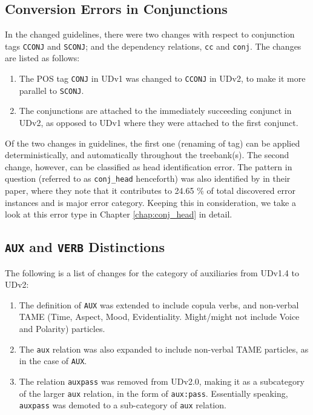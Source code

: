 \subsection{Conversion Errors in Conjunctions}
\label{sssec:conj_head}

In the changed guidelines, there were two changes with respect to conjunction tags \verb|CCONJ| and \verb|SCONJ|; and the dependency relations, \verb|cc| and \verb|conj|. The changes are listed as follows:

\begin{enumerate}
    \item The POS tag \verb|CONJ| in UDv1 was changed to \verb|CCONJ| in UDv2, to make it more parallel to \verb|SCONJ|.
    \item The conjunctions are attached to the immediately succeeding conjunct in UDv2, as opposed to UDv1 where they were attached to the first conjunct.
\end{enumerate}

Of the two changes in guidelines, the first one (renaming of tag) can be applied deterministically, and automatically throughout the treebank(s). The second change, however, can be classified as head identification error. The pattern in question (referred to as \texttt{conj\_head} henceforth) was also identified by \cite{alzetta2017dangerous} in their paper, where they note that it contributes to 24.65 \% of total discovered error instances and is major error category. Keeping this in consideration, we take a look at this error type in Chapter \ref{chap:conj_head} in detail.

\subsection{\texttt{AUX} and \texttt{VERB} Distinctions}
\label{ssec:AuxVERB}

The following is a list of changes for the category of auxiliaries from UDv1.4 to UDv2:

\begin{enumerate}
    \item The definition of \verb|AUX| was extended to include copula verbs, and non-verbal TAME (Time, Aspect, Mood, Evidentiality. Might/might not include Voice and Polarity) particles.
    \item The \verb|aux| relation was also expanded to include non-verbal TAME particles, as in the case of \verb|AUX|.
    \item The relation \verb|auxpass| was removed from UDv2.0, making it as a subcategory of the larger \verb|aux| relation, in the form of \verb|aux:pass|. Essentially speaking, \verb|auxpass| was demoted to a sub-category of \verb|aux| relation.
\end{enumerate}


